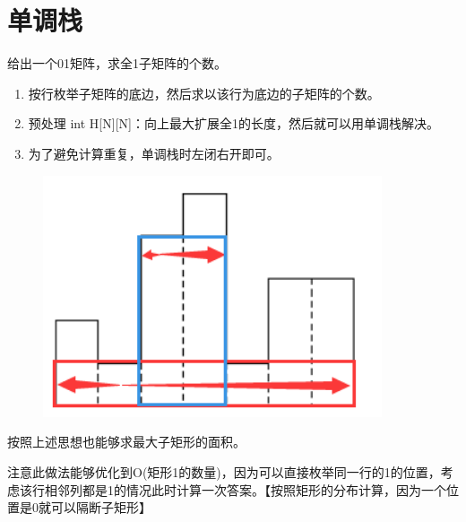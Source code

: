 \section{单调栈}
\par \noindent 给出一个01矩阵，求全1子矩阵的个数。
\begin{enumerate}
\item 按行枚举子矩阵的底边，然后求以该行为底边的子矩阵的个数。
\item 预处理 int H[N][N]：向上最大扩展全1的长度，然后就可以用单调栈解决。
\item 为了避免计算重复，单调栈时左闭右开即可。
\end{enumerate}

\begin{figure}
        \centering
        \par \includegraphics[width=10cm]{images/stack.png}
\end{figure}

\par \noindent 按照上述思想也能够求最大子矩形的面积。
~\\
\par \noindent 注意此做法能够优化到O(矩形1的数量)，因为可以直接枚举同一行的1的位置，考虑该行相邻列都是1的情况此时计算一次答案。【按照矩形的分布计算，因为一个位置是0就可以隔断子矩形】


